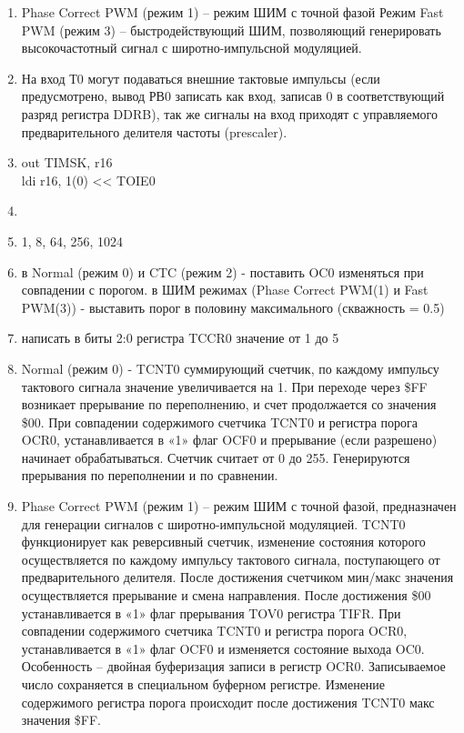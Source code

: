 \documentclass{article}
\begin{document}
\begin{enumerate}
\newpage
		\item Phase Correct PWM (режим 1) – режим ШИМ с точной фазой  
Режим Fast PWM (режим 3) – быстродействующий ШИМ, позволяющий генерировать высокочастотный сигнал с широтно-импульсной модуляцией. 
		\item На вход Т0 могут подаваться внешние тактовые импульсы (если предусмотрено, вывод РВ0 записать как вход, записав 0 в соответствующий разряд регистра DDRB), так же сигналы на вход приходят с управляемого предварительного делителя частоты (prescaler). 
		\item out TIMSK, r16 \\
ldi r16, 1(0) << TOIE0 
		\item \begin{figure}[h!]
		\end{figure}
\newpage
		\item 1, 8, 64, 256, 1024 
		\item в Normal (режим 0) и CTC (режим 2) - поставить OC0 изменяться при совпадении с порогом.  
в ШИМ режимах (Phase Correct PWM(1) и Fast PWM(3)) - выставить порог в половину максимального (скважность = 0.5) 
		\item     написать в биты 2:0 регистра TCCR0 значение от 1 до 5
		\begin{figure}[h!]
		\end{figure}
\newpage
		\item Normal (режим 0) - TCNT0 суммирующий счетчик, по каждому импульсу тактового сигнала значение увеличивается на 1. При переходе через \$FF возникает прерывание по переполнению, и счет продолжается со значения \$00. При совпадении содержимого счетчика TCNT0 и регистра порога OCR0, устанавливается в «1» флаг OCF0 и прерывание (если разрешено) начинает обрабатываться.  
Счетчик считает от 0 до 255. Генерируются прерывания по переполнении и по сравнении. 
		\item Phase Correct PWM (режим 1) – режим ШИМ с точной фазой, предназначен для генерации сигналов с широтно-импульсной модуляцией. TCNT0 функционирует как реверсивный счетчик, изменение состояния которого осуществляется по каждому импульсу тактового сигнала, поступающего от предварительного делителя. После достижения счетчиком мин/макс значения осуществляется прерывание и смена направления. После достижения \$00 устанавливается в «1» флаг прерывания TOV0 регистра TIFR. При совпадении содержимого счетчика TCNT0 и регистра порога OCR0, устанавливается в «1» флаг OCF0 и изменяется состояние выхода OC0. Особенность – двойная буферизация записи в регистр OCR0. Записываемое число сохраняется в специальном буферном регистре. Изменение содержимого регистра порога происходит после достижения TCNT0 макс значения \$FF. 

\end{enumerate}
\end{document}
